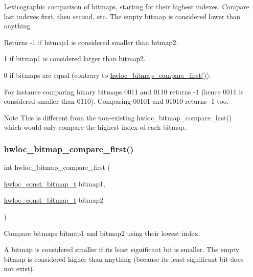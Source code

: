 Lexicographic comparison of bitmaps, starting for their highest indexes. Compare last indexes first, then second, etc. The empty bitmap is considered lower than anything.

\begin{DoxyReturn}{Returns}
-\/1 if {\ttfamily bitmap1} is considered smaller than {\ttfamily bitmap2}. 

1 if {\ttfamily bitmap1} is considered larger than {\ttfamily bitmap2}. 

0 if bitmaps are equal (contrary to \hyperlink{a00205_gaa39cda1510ab721b5c012c76ead72365}{hwloc\+\_\+bitmap\+\_\+compare\+\_\+first()}).
\end{DoxyReturn}
For instance comparing binary bitmaps 0011 and 0110 returns -\/1 (hence 0011 is considered smaller than 0110). Comparing 00101 and 01010 returns -\/1 too.

\begin{DoxyNote}{Note}
This is different from the non-\/existing hwloc\+\_\+bitmap\+\_\+compare\+\_\+last() which would only compare the highest index of each bitmap. 
\end{DoxyNote}
\mbox{\label{a00205_gaa39cda1510ab721b5c012c76ead72365}} 
\subsubsection{\texorpdfstring{hwloc\+\_\+bitmap\+\_\+compare\+\_\+first()}{hwloc\_bitmap\_compare\_first()}}
{\footnotesize\ttfamily int hwloc\+\_\+bitmap\+\_\+compare\+\_\+first (\begin{DoxyParamCaption}\item[{\hyperlink{a00205_gae991a108af01d408be2776c5b2c467b2}{hwloc\+\_\+const\+\_\+bitmap\+\_\+t}}]{bitmap1,  }\item[{\hyperlink{a00205_gae991a108af01d408be2776c5b2c467b2}{hwloc\+\_\+const\+\_\+bitmap\+\_\+t}}]{bitmap2 }\end{DoxyParamCaption})}



Compare bitmaps {\ttfamily bitmap1} and {\ttfamily bitmap2} using their lowest index. 

A bitmap is considered smaller if its least significant bit is smaller. The empty bitmap is considered higher than anything (because its least significant bit does not exist).


